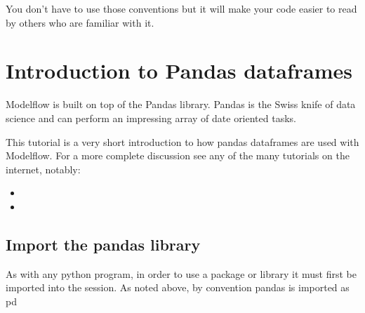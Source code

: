 \documentclass[letterpaper,10pt,english]{jupyterBook}
\begin{document}
\sphinxAtStartPar
You don’t have to use those conventions but it will make your code easier to read by others who are familiar with it.


\chapter{Introduction to Pandas dataframes}
\label{\detokenize{content/04_PythonEssentials/PythonPandasDataframes:introduction-to-pandas-dataframes}}
\sphinxAtStartPar
Modelflow is built on top of the Pandas library. Pandas is the Swiss knife of data science and can perform an impressing array of date oriented tasks.

\sphinxAtStartPar
This tutorial is a very short introduction to how pandas dataframes are used with Modelflow. For a more complete discussion see any of the many tutorials on the internet, notably:
\begin{itemize}
\item {} 
\sphinxAtStartPar
{}

\item {} 
\sphinxAtStartPar
{}

\end{itemize}


\section{Import the pandas library}
\label{\detokenize{content/04_PythonEssentials/PythonPandasDataframes:import-the-pandas-library}}
\sphinxAtStartPar
As with any python program, in order to use a package or library it must first be imported into the session. As noted above, by  convention pandas is imported as pd
\end{document}
